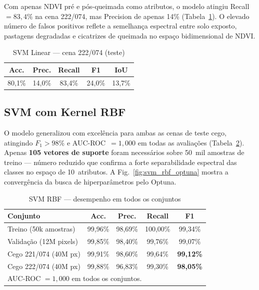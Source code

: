 \documentclass[conference]{IEEEtran}
\begin{document}
Com apenas NDVI pré e pós-queimada como atributos, o modelo atingiu
Recall~$= 83{,}4\%$ na cena 222/074, mas Precision de apenas 14\%
(Tabela~\ref{tab:svm_linear}). O elevado número de falsos positivos
reflete a semelhança espectral entre solo exposto, pastagens degradadas
e cicatrizes de queimada no espaço bidimensional de NDVI.

\begin{table}[!t]
  \caption{SVM Linear — cena 222/074 (teste)}
  \label{tab:svm_linear}
  \centering
  \begin{tabular}{ccccc}
    \toprule
    \textbf{Acc.} & \textbf{Prec.} & \textbf{Recall} & \textbf{F1} & \textbf{IoU} \\
    \midrule
    80,1\% & 14,0\% & 83,4\% & 24,0\% & 13,7\% \\
    \bottomrule
  \end{tabular}
\end{table}

\subsection{SVM com Kernel RBF}

O modelo generalizou com excelência para ambas as cenas de teste cego,
atingindo $F_1 > 98\%$ e AUC-ROC~$= 1{,}000$ em todas as avaliações
(Tabela~\ref{tab:svm_rbf}). Apenas \textbf{105 vetores de suporte}
foram necessários sobre 50~mil amostras de treino — número reduzido
que confirma a forte separabilidade espectral das classes no espaço de
10~atributos. A Fig.~\ref{fig:svm_rbf_optuna} mostra a convergência da
busca de hiperparâmetros pelo Optuna.

\begin{table}[!t]
  \caption{SVM RBF — desempenho em todos os conjuntos}
  \label{tab:svm_rbf}
  \centering
  \setlength{\tabcolsep}{3.5pt}
  \begin{tabular}{lcccc}
    \toprule
    \textbf{Conjunto} & \textbf{Acc.} & \textbf{Prec.} & \textbf{Recall} & \textbf{F1} \\
    \midrule
    Treino (50k amostras)    & 99,96\% & 98,69\% & 100,00\% & 99,34\% \\
    Validação (12M pixels)   & 99,85\% & 98,40\% &  99,76\% & 99,07\% \\
    Cego 221/074 (40M px)    & 99,91\% & 98,60\% &  99,64\% & \textbf{99,12\%} \\
    Cego 222/074 (40M px)    & 99,88\% & 96,83\% &  99,30\% & \textbf{98,05\%} \\
    \bottomrule
    \multicolumn{5}{l}{AUC-ROC $= 1{,}000$ em todos os conjuntos.}
  \end{tabular}
\end{table}
\end{document}

